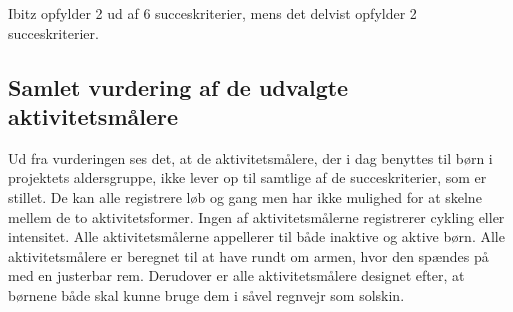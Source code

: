 Ibitz opfylder 2 ud af 6 succeskriterier, mens det delvist opfylder 2 succeskriterier.

\subsection{Samlet vurdering af de udvalgte aktivitetsmålere}
Ud fra vurderingen ses det, at de aktivitetsmålere, der i dag benyttes til børn i projektets aldersgruppe, ikke lever op til samtlige af de succeskriterier, som er stillet. De kan alle registrere løb og gang men har ikke mulighed for at skelne mellem de to aktivitetsformer. Ingen af aktivitetsmålerne registrerer cykling eller intensitet. Alle aktivitetsmålerne appellerer til både inaktive og aktive børn. Alle aktivitetsmålere er beregnet til at have rundt om armen, hvor den spændes på med en justerbar rem. Derudover er alle aktivitetsmålere designet efter, at børnene både skal kunne bruge dem i såvel regnvejr som solskin.

